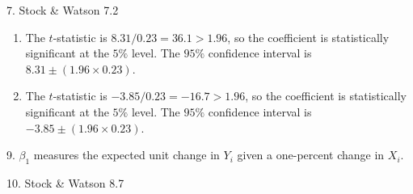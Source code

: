 \documentclass[12pt]{article}
\begin{document}
7. Stock \& Watson 7.2
\begin{enumerate}
  \item The $t$-statistic is $8.31/0.23=36.1>1.96$, so the coefficient is statistically significant at the $5\%$ level.
  The $95\%$ confidence interval is $8.31\pm (1.96\times0.23)$.
  
  \item The $t$-statistic is $-3.85/0.23=-16.7>1.96$, so the coefficient is statistically significant at the $5\%$ level.
  The $95\%$ confidence interval is $-3.85\pm (1.96\times0.23)$.
\end{enumerate}



9.
$\beta_1$ measures the expected unit change in $Y_i$ given a
one-percent change in $X_i$.
\vskip15pt


10. Stock \& Watson 8.7
\end{document}
